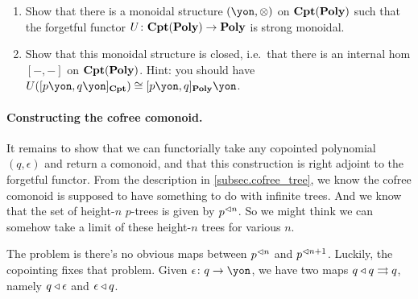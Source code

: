 \documentclass[Book-Poly]{subfiles}
\begin{document}
\begin{exercise}
\begin{enumerate}
	\item Show that there is a monoidal structure $(\yon,\otimes)$ on $\mathbf{Cpt}(\mathbf{Poly})$ such that the forgetful functor $U\colon\mathbf{Cpt}(\mathbf{Poly})\to\mathbf{Poly}$ is strong monoidal.
	\item Show that this monoidal structure is closed, i.e.\ that there is an internal hom $[-,-]$ on $\mathbf{Cpt}(\mathbf{Poly})$. Hint: you should have $U([p\yon,q\yon]_{\Cat{Cpt}})\cong[p\yon,q]_{\poly}\yon$.
\qedhere
\end{enumerate}
\end{exercise}


\paragraph{Constructing the cofree comonoid.}

It remains to show that we can functorially take any copointed polynomial $(q,\epsilon)$ and return a comonoid, and that this construction is right adjoint to the forgetful functor. From the description in \cref{subsec.cofree_tree}, we know the cofree comonoid is supposed to have something to do with infinite trees. And we know that the set of height-$n$ $p$-trees is given by $p^{\lhd n}$. So we might think we can somehow take a limit of these height-$n$ trees for various $n$. 

The problem is there's no obvious maps between $p^{\lhd n}$ and $p^{\lhd n+1}$. Luckily, the copointing fixes that problem. Given $\epsilon\colon q\to\yon$, we have two maps $q\mathbin{\triangleleft} q\rightrightarrows q$, namely $q\mathbin{\triangleleft}\epsilon$ and $\epsilon\mathbin{\triangleleft} q$.
\end{document}

